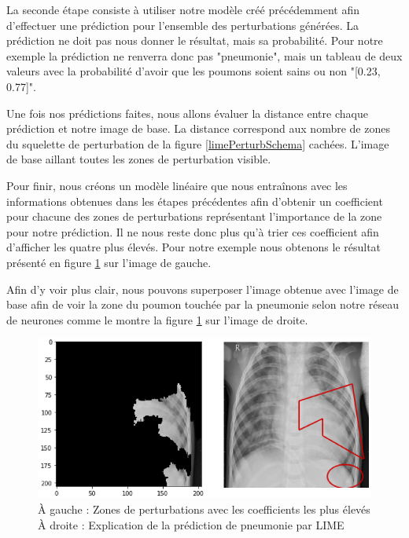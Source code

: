 La seconde étape consiste à utiliser notre modèle créé précédemment afin d'effectuer une prédiction pour l'ensemble des perturbations générées. La prédiction ne doit pas nous donner le résultat, mais sa probabilité. Pour notre exemple la prédiction ne renverra donc pas "pneumonie", mais un tableau de deux valeurs avec la probabilité d'avoir que les poumons soient sains ou non "[0.23, 0.77]".\par
Une fois nos prédictions faites, nous allons évaluer la distance entre chaque prédiction et notre image de base. La distance correspond aux nombre de zones du squelette de perturbation de la figure \ref{limePerturbSchema} cachées. L'image de base aillant toutes les zones de perturbation visible.\par
Pour finir, nous créons un modèle linéaire que nous entraînons avec les informations obtenues dans les étapes précédentes afin d'obtenir un coefficient pour chacune des zones de perturbations représentant l'importance de la zone pour notre prédiction. Il ne nous reste donc plus qu'à trier ces coefficient afin d'afficher les quatre plus élevés. Pour notre exemple nous obtenons le résultat présenté en figure \ref{limeFinalExplain} sur l'image de gauche.

Afin d'y voir plus clair, nous pouvons superposer l'image obtenue avec l'image de base afin de voir la zone du poumon touchée par la pneumonie selon notre réseau de neurones comme le montre la figure \ref{limeFinalExplain} sur l'image de droite.

\begin{figure}[h]
    \includegraphics[scale=0.58]{src_img/limeFinalExplainMerge.png}
    \caption{À gauche : Zones de perturbations avec les coefficients les plus élevés
    À droite : Explication de la prédiction de pneumonie par LIME}
    \label{limeFinalExplain}
\end{figure}
